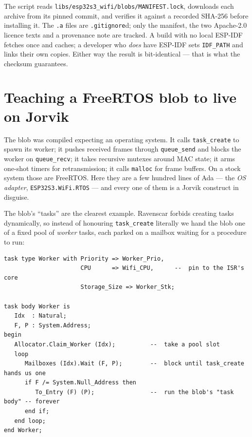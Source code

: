The script reads \texttt{libs/esp32s3\_wifi/blobs/MANIFEST.lock}, downloads each
archive from its pinned commit, and verifies it against a recorded SHA-256 before
installing it. The \texttt{.a} files are \texttt{.gitignore}d; only the manifest,
the two Apache-2.0 licence texts and a provenance note are tracked. A build with
no local ESP-IDF fetches once and caches; a developer who \emph{does} have
ESP-IDF sets \texttt{IDF\_PATH} and links their own copies. Either way the result
is bit-identical --- that is what the checksum guarantees.


\section{Teaching a FreeRTOS blob to live on Jorvik}
\label{ch:wifi:osadapter}

The blob was compiled expecting an operating system. It calls \texttt{task\_create}
to spawn its worker; it pushes received frames through \texttt{queue\_send} and
blocks the worker on \texttt{queue\_recv}; it takes recursive mutexes around MAC
state; it arms one-shot timers for retransmission; it calls \texttt{malloc} for
frame buffers. On a stock system those are FreeRTOS. Here they are a few hundred
lines of Ada --- the \emph{OS adapter}, \texttt{ESP32S3.WiFi.RTOS} --- and every
one of them is a Jorvik construct in disguise.

The blob's ``tasks'' are the clearest example. Ravenscar forbids creating tasks
dynamically, so instead of honouring \texttt{task\_create} literally we hand the
blob one of a fixed pool of \emph{worker} tasks, each parked on a mailbox waiting
for a procedure to run:

\begin{lstlisting}
task type Worker with Priority => Worker_Prio,
                      CPU      => Wifi_CPU,      --  pin to the ISR's core
                      Storage_Size => Worker_Stk;

task body Worker is
   Idx  : Natural;
   F, P : System.Address;
begin
   Allocator.Claim_Worker (Idx);          --  take a pool slot
   loop
      Mailboxes (Idx).Wait (F, P);        --  block until task_create hands us one
      if F /= System.Null_Address then
         To_Entry (F) (P);                --  run the blob's "task body" -- forever
      end if;
   end loop;
end Worker;
\end{lstlisting}

